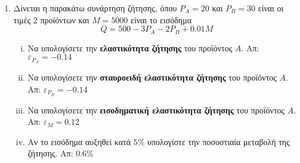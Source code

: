 \documentclass[a4paper,table]{report}
\begin{document}
\begin{enumerate}
  \item Δίνεται η παρακάτω συνάρτηση ζήτησης, όπου $P_{A}=20$ και $ P_{B}=30 $ 
    είναι οι τιμές 2 προϊόντων και $M=5000$ είναι το εισόδημα
    \[
      Q=500-3P_{A}-2P_{B}+0.01M
    \]
    \begin{enumerate}[i)]
      \item Να υπολογίσετε την \textbf{ελαστικότητα ζήτησης} του προϊόντος $A$. 
        \hfill Απ: $ \varepsilon_{P_A} = -0.14 $
      \item Να υπολογίσετε την \textbf{σταυροειδή ελαστικότητα ζήτησης} του προϊόντος 
        $A$.
        \hfill Απ: $ \varepsilon_{P_B} = -0.14 $
      \item Να υπολογίσετε την \textbf{εισοδηματική ελαστικότητα ζήτησης} του προϊόντος $A$.
        \hfill Απ: $ \varepsilon_{M} = 0.12 $
      \item Αν το εισόδημα αυξηθεί κατά $ 5\% $ υπολογίστε την ποσοστιαία μεταβολή 
        της ζήτησης. \hfill Απ: $ 0.6\% $ 
    \end{enumerate}

\end{enumerate}
\end{document}

